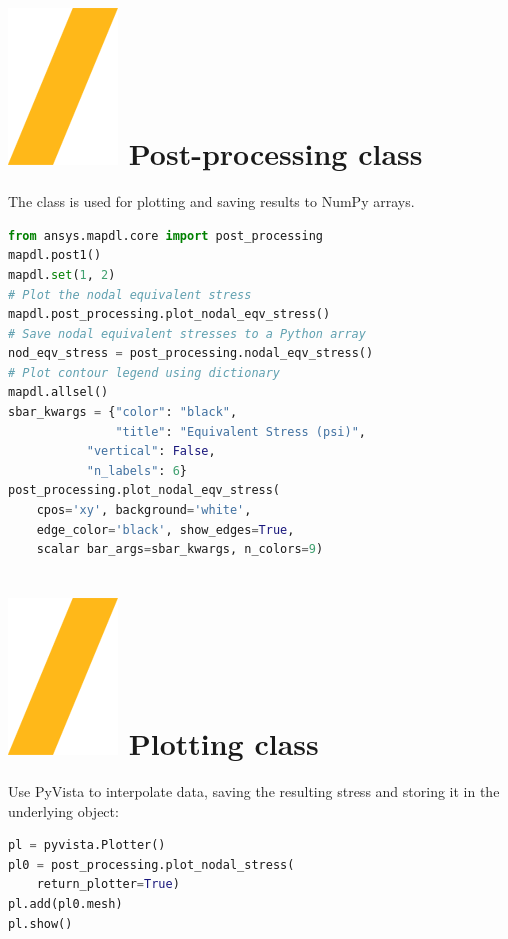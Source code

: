 \documentclass[9pt,landscape]{article}
\begin{document}
\begin{multicols}{3}
\section{\includegraphics[height=\fontcharht\font`\S]{slash.png} Post-processing class}
The  class is used for plotting and saving results to NumPy arrays.
\begin{lstlisting}[language=Python]
from ansys.mapdl.core import post_processing
mapdl.post1()
mapdl.set(1, 2)
# Plot the nodal equivalent stress
mapdl.post_processing.plot_nodal_eqv_stress()
# Save nodal equivalent stresses to a Python array
nod_eqv_stress = post_processing.nodal_eqv_stress()
# Plot contour legend using dictionary
mapdl.allsel()
sbar_kwargs = {"color": "black",
               "title": "Equivalent Stress (psi)",
	       "vertical": False,
	       "n_labels": 6}
post_processing.plot_nodal_eqv_stress(
    cpos='xy', background='white',
    edge_color='black', show_edges=True,
    scalar bar_args=sbar_kwargs, n_colors=9)
\end{lstlisting} 
\vfill

\section{\includegraphics[height=\fontcharht\font`\S]{slash.png} Plotting class}
Use PyVista to interpolate data, saving the resulting stress and storing it in the underlying  object:
\begin{lstlisting}[language=Python]
pl = pyvista.Plotter()
pl0 = post_processing.plot_nodal_stress(
    return_plotter=True)
pl.add(pl0.mesh)
pl.show()
\end{lstlisting} 


\end{multicols}
\end{document}
